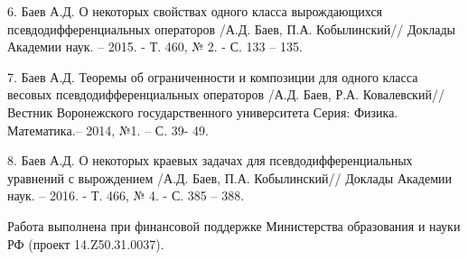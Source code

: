 {6. Баев А.Д. О некоторых свойствах одного класса вырождающихся
псевдодифференциальных операторов /А.Д. Баев, П.А. Кобылинский// Доклады
Академии наук. -- 2015. - Т. 460, № 2. - С. 133 -- 135.

7. Баев А.Д. Теоремы об ограниченности и композиции для одного класса
весовых псевдодифференциальных операторов /А.Д. Баев, Р.А. Ковалевский//
Вестник Воронежского государственного университета Серия: Физика.
Математика.-- 2014, №1. -- С. 39- 49.

8. Баев А.Д. О некоторых краевых задачах для псевдодифференциальных
уравнений с вырождением /А.Д. Баев, П.А. Кобылинский// Доклады Академии
наук. -- 2016. - Т. 466, № 4. - С. 385 -- 388.





Работа выполнена при финансовой поддержке Министерства образования и науки
РФ (проект 14.Z50.31.0037).

}
